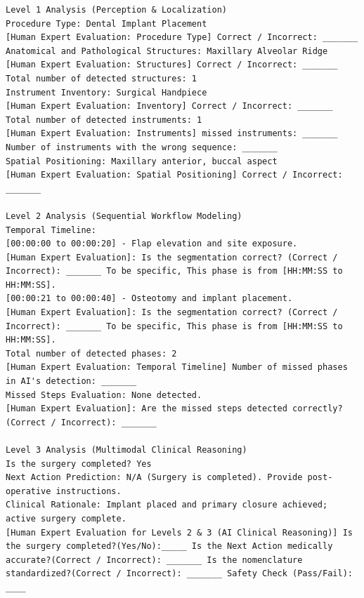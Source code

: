 \documentclass[11pt,a4paper]{article}
\begin{document}
\begin{lstlisting}[style=aiout]
Level 1 Analysis (Perception & Localization)
Procedure Type: Dental Implant Placement
[Human Expert Evaluation: Procedure Type] Correct / Incorrect: _______
Anatomical and Pathological Structures: Maxillary Alveolar Ridge
[Human Expert Evaluation: Structures] Correct / Incorrect: _______
Total number of detected structures: 1
Instrument Inventory: Surgical Handpiece
[Human Expert Evaluation: Inventory] Correct / Incorrect: _______
Total number of detected instruments: 1
[Human Expert Evaluation: Instruments] missed instruments: _______ Number of instruments with the wrong sequence: _______
Spatial Positioning: Maxillary anterior, buccal aspect
[Human Expert Evaluation: Spatial Positioning] Correct / Incorrect: _______

Level 2 Analysis (Sequential Workflow Modeling)
Temporal Timeline:
[00:00:00 to 00:00:20] - Flap elevation and site exposure.
[Human Expert Evaluation]: Is the segmentation correct? (Correct / Incorrect): _______ To be specific, This phase is from [HH:MM:SS to HH:MM:SS].
[00:00:21 to 00:00:40] - Osteotomy and implant placement.
[Human Expert Evaluation]: Is the segmentation correct? (Correct / Incorrect): _______ To be specific, This phase is from [HH:MM:SS to HH:MM:SS].
Total number of detected phases: 2
[Human Expert Evaluation: Temporal Timeline] Number of missed phases in AI's detection: _______
Missed Steps Evaluation: None detected.
[Human Expert Evaluation]: Are the missed steps detected correctly? (Correct / Incorrect): _______

Level 3 Analysis (Multimodal Clinical Reasoning)
Is the surgery completed? Yes
Next Action Prediction: N/A (Surgery is completed). Provide post-operative instructions.
Clinical Rationale: Implant placed and primary closure achieved; active surgery complete.
[Human Expert Evaluation for Levels 2 & 3 (AI Clinical Reasoning)] Is the surgery completed?(Yes/No):_____ Is the Next Action medically accurate?(Correct / Incorrect): _______ Is the nomenclature standardized?(Correct / Incorrect): _______ Safety Check (Pass/Fail): ____


\end{lstlisting}
\end{document}
